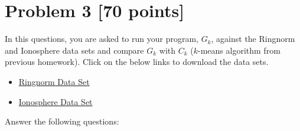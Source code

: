 \documentclass[a4paper,12pt]{article}
\begin{document}

\newpage
\section*{Problem 3 [70 points]}

In this questions, you are asked to run your program, $G_k$, against the Ringnorm and Ionosphere data sets and compare $G_k$  with  $C_k$ ($k$-means algorithm from previous homework).  Click on the below links to download the data sets.
 \begin{itemize}
 \item  \href{http://mldata.org/repository/data/viewslug/ringnorm-ida/}{Ringnorm Data Set}
 \item  \href{https://archive.ics.uci.edu/ml/datasets/ionosphere}{
Ionosphere Data Set }
 \end{itemize}

Answer the following questions:
\end{document}
